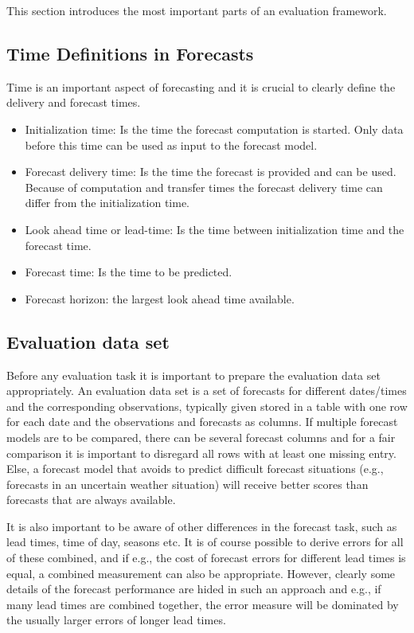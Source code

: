 This section introduces the most important parts of an evaluation framework.

\subsection{Time Definitions in Forecasts}
Time is an important aspect of forecasting and it is crucial to clearly define the delivery and forecast times.
\begin{itemize}
    \item Initialization time: Is the time the forecast computation is started. Only data before this time can be used as input to the forecast model.
    \item Forecast delivery time: Is the time the forecast is provided and can be used. Because of computation and transfer times the forecast delivery time can differ from the initialization time.
    \item Look ahead time or lead-time: Is the time between initialization time and the forecast time.
    \item Forecast time: Is the time to be predicted.
    \item Forecast horizon: the largest look ahead time available.
\end{itemize}

\subsection{Evaluation data set}
Before any evaluation task it is important to prepare the evaluation data set appropriately.
An evaluation data set is a set of forecasts for different dates/times and the corresponding observations, typically given stored in a table with one row for each date and the observations and forecasts as columns. 
If multiple forecast models are to be compared, there can be several forecast columns and for a fair comparison it is important to disregard all rows with at least one missing entry. 
Else, a forecast model that avoids to predict difficult forecast situations (e.g., forecasts in an uncertain weather situation) will receive better scores than forecasts that are always available.

It is also important to be aware of other differences in the forecast task, such as lead times, time of day, seasons etc. 
It is of course possible to derive errors for all of these combined, and if e.g., the cost of forecast errors for different lead times is equal, a combined measurement can also be appropriate. 
However, clearly some details of the forecast performance are hided in such an approach and e.g., if many lead times are combined together, the error measure will be dominated by the usually larger errors of longer lead times.


